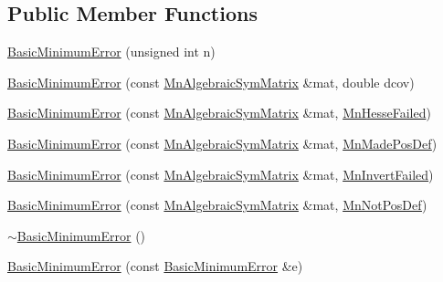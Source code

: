 \subsection*{Public Member Functions}
\begin{DoxyCompactItemize}
\item 
\mbox{\hyperlink{classROOT_1_1Minuit2_1_1BasicMinimumError_a7f1275c770648ade3a1f58f23e861783}{Basic\+Minimum\+Error}} (unsigned int n)
\item 
\mbox{\hyperlink{classROOT_1_1Minuit2_1_1BasicMinimumError_a1896b4c1b5594ca688e33de9bcbadbbc}{Basic\+Minimum\+Error}} (const \mbox{\hyperlink{namespaceROOT_1_1Minuit2_a9e74ad97f5537a2e80e52b04d98ecc6e}{Mn\+Algebraic\+Sym\+Matrix}} \&mat, double dcov)
\item 
\mbox{\hyperlink{classROOT_1_1Minuit2_1_1BasicMinimumError_a86d224646bf8e8db5c8054f1ffbb9276}{Basic\+Minimum\+Error}} (const \mbox{\hyperlink{namespaceROOT_1_1Minuit2_a9e74ad97f5537a2e80e52b04d98ecc6e}{Mn\+Algebraic\+Sym\+Matrix}} \&mat, \mbox{\hyperlink{classROOT_1_1Minuit2_1_1BasicMinimumError_1_1MnHesseFailed}{Mn\+Hesse\+Failed}})
\item 
\mbox{\hyperlink{classROOT_1_1Minuit2_1_1BasicMinimumError_a26edd7532675ec7f800a1b761fee1ce9}{Basic\+Minimum\+Error}} (const \mbox{\hyperlink{namespaceROOT_1_1Minuit2_a9e74ad97f5537a2e80e52b04d98ecc6e}{Mn\+Algebraic\+Sym\+Matrix}} \&mat, \mbox{\hyperlink{classROOT_1_1Minuit2_1_1BasicMinimumError_1_1MnMadePosDef}{Mn\+Made\+Pos\+Def}})
\item 
\mbox{\hyperlink{classROOT_1_1Minuit2_1_1BasicMinimumError_ad86ba685d218b1dabbfb90401825cc3f}{Basic\+Minimum\+Error}} (const \mbox{\hyperlink{namespaceROOT_1_1Minuit2_a9e74ad97f5537a2e80e52b04d98ecc6e}{Mn\+Algebraic\+Sym\+Matrix}} \&mat, \mbox{\hyperlink{classROOT_1_1Minuit2_1_1BasicMinimumError_1_1MnInvertFailed}{Mn\+Invert\+Failed}})
\item 
\mbox{\hyperlink{classROOT_1_1Minuit2_1_1BasicMinimumError_acfab85d4ea3043d0bca233fc654abeeb}{Basic\+Minimum\+Error}} (const \mbox{\hyperlink{namespaceROOT_1_1Minuit2_a9e74ad97f5537a2e80e52b04d98ecc6e}{Mn\+Algebraic\+Sym\+Matrix}} \&mat, \mbox{\hyperlink{classROOT_1_1Minuit2_1_1BasicMinimumError_1_1MnNotPosDef}{Mn\+Not\+Pos\+Def}})
\item 
\mbox{\hyperlink{classROOT_1_1Minuit2_1_1BasicMinimumError_abc20620bfacb0c914679cfa812e9b11d}{$\sim$\+Basic\+Minimum\+Error}} ()
\item 
\mbox{\hyperlink{classROOT_1_1Minuit2_1_1BasicMinimumError_a3552bc2f2c8fd9655b92c2f9ee5a5612}{Basic\+Minimum\+Error}} (const \mbox{\hyperlink{classROOT_1_1Minuit2_1_1BasicMinimumError}{Basic\+Minimum\+Error}} \&e)

\end{DoxyCompactItemize}
